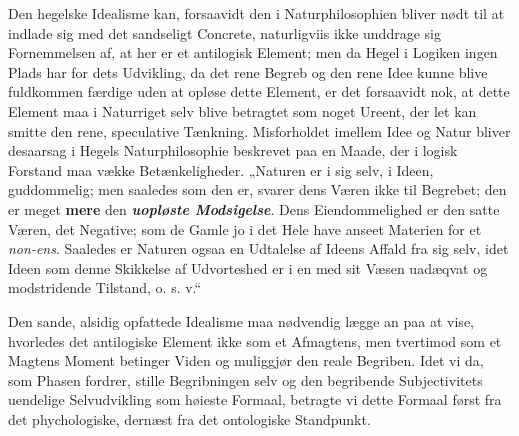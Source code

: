 \documentclass[11pt]{book}
\newcommand{\opage}[1]{\marginnote{\footnotesize\textit{[#1]}}}
\begin{document}
Den hegelske Idealisme kan, forsaavidt den i Naturphilosophien
bliver nødt til at indlade sig med det sandseligt Concrete,
naturligviis ikke unddrage sig Fornemmelsen af, at her er et
antilogisk Element; men da Hegel i Logiken ingen Plads har for dets
Udvikling, da det rene Begreb og den rene Idee kunne blive
fuldkommen færdige uden at opløse dette Element, er det forsaavidt
nok, at dette Element maa i Naturriget selv blive betragtet som
noget Ureent, der let kan smitte den rene, speculative Tænkning.
Misforholdet imellem Idee og Natur bliver desaarsag i Hegels
Naturphilosophie beskrevet paa en Maade, der i logisk Forstand maa
vække
\opage{189} \setcounter{footnote}{0}%
Betænkeligheder. „Naturen er i sig selv, i Ideen, guddommelig; men
saaledes som den er, svarer dens Væren ikke til Begrebet; den er meget
\textbf{mere} den \emph{\textbf{uopløste Modsigelse}}. Dens
Eiendommelighed er den satte Væren, det Negative; som de Gamle jo i det
Hele have anseet Materien for et \textit{non-ens}. Saaledes er Naturen
ogsaa en Udtalelse af Ideens Affald fra sig selv, idet Ideen som denne
Skikkelse af Udvorteshed er i en med sit Væsen uadæqvat og modstridende
Tilstand, o. s. v.“

Den sande, alsidig opfattede Idealisme maa nødvendig lægge an paa at
vise, hvorledes det antilogiske Element ikke som et Afmagtens, men
tvertimod som et Magtens Moment betinger Viden og muliggjør den reale
Begriben. Idet vi da, som Phasen fordrer, stille Begribningen selv og
den begribende Subjectivitets uendelige Selvudvikling som høieste
Formaal, betragte vi dette Formaal først fra det phychologiske, dernæst
fra det ontologiske Standpunkt.
\end{document}
